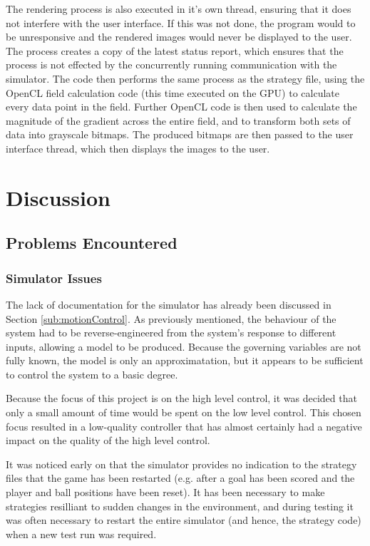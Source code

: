 \documentclass[10pt]{article}
\begin{document}
The rendering process is also executed in it's own thread, ensuring that it does
not interfere with the user interface. If this was not done, the program would
to be unresponsive and the rendered images would never be displayed to the user.
The process creates a copy of the latest status report, which ensures that the
process is not effected by the concurrently running communication with the
simulator. The code then performs the same process as the strategy file, using
the OpenCL field calculation code (this time executed on the GPU) to
calculate every data point in the field. Further OpenCL code is then used to
calculate the magnitude of the gradient across the entire field, and to
transform both sets of data into grayscale bitmaps. The produced bitmaps are
then passed to the user interface thread, which then displays the images to the
user.

\section{Discussion}

\subsection{Problems Encountered} 

\subsubsection{Simulator Issues\label{sub:simulatorIssues}}

The lack of documentation for the simulator has already been discussed in
Section \ref{sub:motionControl}.  As previously mentioned, the behaviour of the
system had to be reverse-engineered from the system's response to different
inputs, allowing a model to be produced.  Because the governing variables are
not fully known, the model is only an approximatation, but it appears to be
sufficient to control the system to a basic degree.

Because the focus of this project is on the high level control, it was decided
that only a small amount of time would be spent on the low level control.  This
chosen focus resulted in a low-quality controller that has almost certainly had
a negative impact on the quality of the high level control.

It was noticed early on that the simulator provides no indication to the
strategy files that the game has been restarted (e.g. after a goal has been
scored and the player and ball positions have been reset).  It has been
necessary to make strategies resilliant to sudden changes in the environment,
and during testing it was often necessary to restart the entire simulator (and
hence, the strategy code) when a new test run was required.
\end{document}
